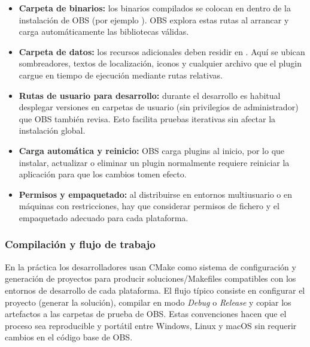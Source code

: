 \begin{itemize}
  \item \textbf{Carpeta de binarios:} los binarios compilados se colocan en  dentro de la instalación de OBS (por ejemplo ). OBS explora estas rutas al arrancar y carga automáticamente las bibliotecas válidas.
  \item \textbf{Carpeta de datos:} los recursos adicionales deben residir en . Aquí se ubican sombreadores, textos de localización, iconos y cualquier archivo que el plugin cargue en tiempo de ejecución mediante rutas relativas.


  \item \textbf{Rutas de usuario para desarrollo:} durante el desarrollo es habitual desplegar versiones en carpetas de usuario (sin privilegios de administrador) que OBS también revisa. Esto facilita pruebas iterativas sin afectar la instalación global.
  \item \textbf{Carga automática y reinicio:} OBS carga plugins al inicio, por lo que instalar, actualizar o eliminar un plugin normalmente requiere reiniciar la aplicación para que los cambios tomen efecto.
  \item \textbf{Permisos y empaquetado:} al distribuirse en entornos multiusuario o en máquinas con restricciones, hay que considerar permisos de fichero y el empaquetado adecuado para cada plataforma.

\end{itemize}

\subsubsection*{Compilación y flujo de trabajo}
En la práctica los desarrolladores usan CMake como sistema de configuración y generación de proyectos para producir soluciones/Makefiles compatibles con los entornos de desarrollo de cada plataforma. El flujo típico consiste en configurar el proyecto (generar la solución), compilar en modo \emph{Debug} o \emph{Release} y copiar los artefactos a las carpetas de prueba de OBS. Estas convenciones hacen que el proceso sea reproducible y portátil entre Windows, Linux y macOS sin requerir cambios en el código base de OBS.


